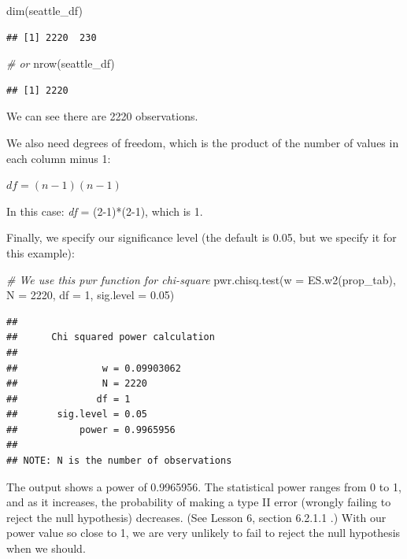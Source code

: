 \documentclass[
]{book}
\newenvironment{Shaded}{\begin{snugshade}}{\end{snugshade}}
\newcommand{\AttributeTok}[1]{\textcolor[rgb]{0.77,0.63,0.00}{#1}}
\newcommand{\CommentTok}[1]{\textcolor[rgb]{0.56,0.35,0.01}{\textit{#1}}}
\newcommand{\DecValTok}[1]{\textcolor[rgb]{0.00,0.00,0.81}{#1}}
\newcommand{\FloatTok}[1]{\textcolor[rgb]{0.00,0.00,0.81}{#1}}
\newcommand{\FunctionTok}[1]{\textcolor[rgb]{0.00,0.00,0.00}{#1}}
\newcommand{\NormalTok}[1]{#1}
\begin{document}
\begin{Shaded}
\begin{Highlighting}[]
\FunctionTok{dim}\NormalTok{(seattle\_df) }
\end{Highlighting}
\end{Shaded}

\begin{verbatim}
## [1] 2220  230
\end{verbatim}

\begin{Shaded}
\begin{Highlighting}[]
\CommentTok{\# or}
\FunctionTok{nrow}\NormalTok{(seattle\_df)}
\end{Highlighting}
\end{Shaded}

\begin{verbatim}
## [1] 2220
\end{verbatim}

We can see there are 2220 observations.

We also need degrees of freedom, which is the product of the number of values in each column minus 1:

\(df = (n-1)(n-1)\)

In this case: \emph{df} = (2-1)*(2-1), which is 1.

Finally, we specify our significance level (the default is 0.05, but we specify it for this example):

\begin{Shaded}
\begin{Highlighting}[]
\CommentTok{\# We use this \textasciigrave{}pwr\textasciigrave{} function for chi{-}square}
\FunctionTok{pwr.chisq.test}\NormalTok{(}\AttributeTok{w =} \FunctionTok{ES.w2}\NormalTok{(prop\_tab), }\AttributeTok{N =} \DecValTok{2220}\NormalTok{, }\AttributeTok{df =} \DecValTok{1}\NormalTok{, }\AttributeTok{sig.level =}  \FloatTok{0.05}\NormalTok{)}
\end{Highlighting}
\end{Shaded}

\begin{verbatim}
## 
##      Chi squared power calculation 
## 
##               w = 0.09903062
##               N = 2220
##              df = 1
##       sig.level = 0.05
##           power = 0.9965956
## 
## NOTE: N is the number of observations
\end{verbatim}

The output shows a power of 0.9965956. The statistical power ranges from 0 to 1, and as it increases, the probability of making a type II error (wrongly failing to reject the null hypothesis) decreases. (See Lesson 6, section 6.2.1.1 .) With our power value so close to 1, we are very unlikely to fail to reject the null hypothesis when we should.
\end{document}
